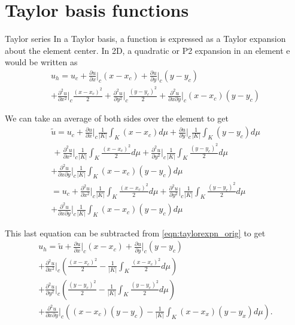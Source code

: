 \documentclass[11pt]{beamer}
\begin{document}
\section{Taylor basis functions}
\begin{frame}{Taylor series}
In a Taylor basis, a function is expressed as a Taylor expansion about the element center. In 2D, a quadratic or P2 expansion in an element e would be written as
\begin{multline}
u_h = u_c + \frac{\partial u}{\partial x} \Big|_c(x-x_c) + \frac{\partial u}{\partial y} \Big|_c(y-y_c) \\ + \frac{\partial^2 u}{\partial x^2} \Big|_c \frac{(x-x_c)^2}{2} + \frac{\partial^2 u}{\partial y^2} \Big|_c \frac{(y-y_c)^2}{2} + \frac{\partial^2 u}{\partial x\partial y} \Big|_c (x-x_c)(y-y_c)
\label{eqn:taylorexpn_orig}
\end{multline}
\end{frame} 
\begin{frame}
We can take an average of both sides over the element to get
\begin{multline}
\tilde{u} = u_c + \frac{\partial u}{\partial x} \Big|_c \frac{1}{|K|}\int_K(x-x_c)d\mu + \frac{\partial u}{\partial y} \Big|_c \frac{1}{|K|}\int_K (y-y_c)d\mu \\ \, + \frac{\partial^2 u}{\partial x^2} \Big|_c \frac{1}{|K|}\int_K \frac{(x-x_c)^2}{2}d\mu + \frac{\partial^2 u}{\partial y^2} \Big|_c \frac{1}{|K|}\int_K \frac{(y-y_c)^2}{2}d\mu \\ + \frac{\partial^2 u}{\partial x\partial y} \Big|_c \frac{1}{|K|}\int_K (x-x_c)(y-y_c)d\mu \\
= u_c + \frac{\partial^2 u}{\partial x^2} \Big|_c \frac{1}{|K|}\int_K \frac{(x-x_c)^2}{2}d\mu + \frac{\partial^2 u}{\partial y^2} \Big|_c \frac{1}{|K|}\int_K \frac{(y-y_c)^2}{2}d\mu \\+ \frac{\partial^2 u}{\partial x\partial y} \Big|_c \frac{1}{|K|}\int_K (x-x_c)(y-y_c)d\mu
\end{multline}
\end{frame}
\begin{frame} 
This last equation can be subtracted from \eqref{eqn:taylorexpn_orig} to get
\begin{multline}
u_h = \tilde{u} + \frac{\partial u}{\partial x} \Big|_c(x-x_c) + \frac{\partial u}{\partial y} \Big|_c(y-y_c) \\+ \frac{\partial^2 u}{\partial x^2} \Big|_c \left( \frac{(x-x_c)^2}{2} - \frac{1}{|K|}\int_K \frac{(x-x_c)^2}{2}d\mu \right) \\ + \frac{\partial^2 u}{\partial y^2} \Big|_c \left( \frac{(y-y_c)^2}{2} -\frac{1}{|K|}\int_K \frac{(y-y_c)^2}{2}d\mu \right) \\+ \frac{\partial^2 u}{\partial x\partial y} \Big|_c \left( (x-x_c)(y-y_c) - \frac{1}{|K|}\int_K (x-x_x)(y-y_x)d\mu \right).
\label{eqn:taylorexpn}
\end{multline}
\end{frame}
\end{document}
